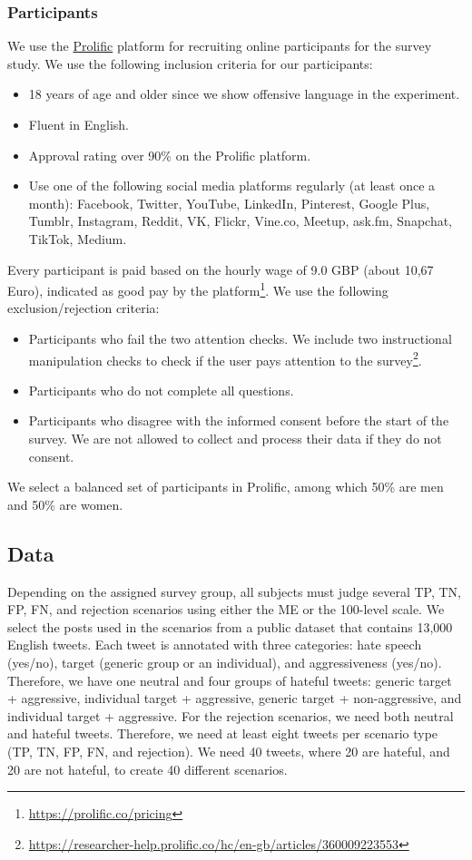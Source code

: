 \subsubsection{Participants}
We use the \href{https://prolific.co}{Prolific} platform for recruiting online participants for the survey study.
%
We use the following inclusion criteria for our participants:
\begin{itemize}
    \item 18 years of age and older since we show offensive language in the experiment.
    \item Fluent in English.
    \item Approval rating over 90\% on the Prolific platform.
    \item Use one of the following social media platforms regularly (at least once a month): Facebook, Twitter, YouTube, LinkedIn, Pinterest, Google Plus, Tumblr, Instagram, Reddit, VK, Flickr, Vine.co, Meetup, ask.fm, Snapchat, TikTok, Medium.
\end{itemize}
%
Every participant is paid based on the hourly wage of 9.0 GBP (about 10,67 Euro), indicated as good pay by the platform\footnote{\url{https://prolific.co/pricing}}.
%
We use the following exclusion/rejection criteria:
\begin{itemize}
    \item Participants who fail the two attention checks. We include two instructional manipulation checks to check if the user pays attention to the survey\footnote{\url{https://researcher-help.prolific.co/hc/en-gb/articles/360009223553}}.
    \item Participants who do not complete all questions.
    \item Participants who disagree with the informed consent before the start of the survey. We are not allowed to collect and process their data if they do not consent.
\end{itemize}
%
We select a balanced set of participants in Prolific, among which 50\% are men and 50\% are women.

\subsection{Data}
\label{sec:data}
Depending on the assigned survey group, all subjects must judge several TP, TN, FP, FN, and rejection scenarios using either the ME or the 100-level scale.
%
We select the posts used in the scenarios from a public dataset \citep{basile2019semeval} that contains 13,000 English tweets.
%
Each tweet is annotated with three categories: hate speech (yes/no), target (generic group or an individual), and aggressiveness (yes/no).
%
Therefore, we have one neutral and four groups of hateful tweets: generic target + aggressive, individual target + aggressive, generic target + non-aggressive, and individual target + aggressive.
%
For the rejection scenarios, we need both neutral and hateful tweets.
%
Therefore, we need at least eight tweets per scenario type (TP, TN, FP, FN, and rejection).
%
We need 40 tweets, where 20 are hateful, and 20 are not hateful, to create 40 different scenarios.
%

